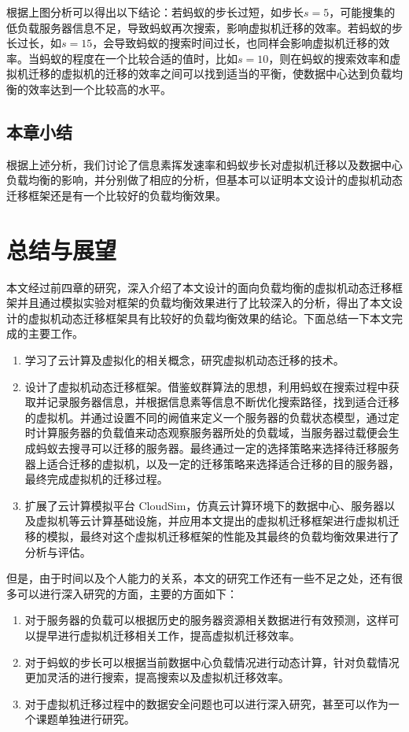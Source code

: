 根据上图分析可以得出以下结论：若蚂蚁的步长过短，如步长$ s = 5$，可能搜集的低负载服务器信息不足，导致蚂蚁再次搜索，影响虚拟机迁移的效率。若蚂蚁的步长过长，如$ s = 15 $，会导致蚂蚁的搜索时间过长，也同样会影响虚拟机迁移的效率。当蚂蚁的程度在一个比较合适的值时，比如$ s = 10 $，则在蚂蚁的搜索效率和虚拟机迁移的虚拟机的迁移的效率之间可以找到适当的平衡，使数据中心达到负载均衡的效率达到一个比较高的水平。

 \section{本章小结}
根据上述分析，我们讨论了信息素挥发速率和蚂蚁步长对虚拟机迁移以及数据中心负载均衡的影响，并分别做了相应的分析，但基本可以证明本文设计的虚拟机动态迁移框架还是有一个比较好的负载均衡效果。

\chapter{总结与展望}
本文经过前四章的研究，深入介绍了本文设计的面向负载均衡的虚拟机动态迁移框架并且通过模拟实验对框架的负载均衡效果进行了比较深入的分析，得出了本文设计的虚拟机动态迁移框架具有比较好的负载均衡效果的结论。下面总结一下本文完成的主要工作。

\begin{enumerate}[(1)]
    \item 学习了云计算及虚拟化的相关概念，研究虚拟机动态迁移的技术。
    \item 设计了虚拟机动态迁移框架。借鉴蚁群算法的思想，利用蚂蚁在搜索过程中获取并记录服务器信息，并根据信息素等信息不断优化搜索路径，找到适合迁移的虚拟机。并通过设置不同的阙值来定义一个服务器的负载状态模型，通过定时计算服务器的负载值来动态观察服务器所处的负载域，当服务器过载便会生成蚂蚁去搜寻可以迁移的服务器。最终通过一定的选择策略来选择待迁移服务器上适合迁移的虚拟机，以及一定的迁移策略来选择适合迁移的目的服务器，最终完成虚拟机的迁移过程。
    \item 扩展了云计算模拟平台 CloudSim，仿真云计算环境下的数据中心、服务器以及虚拟机等云计算基础设施，并应用本文提出的虚拟机迁移框架进行虚拟机迁移的模拟，最终对这个虚拟机迁移框架的性能及其最终的负载均衡效果进行了分析与评估。
\end{enumerate}

但是，由于时间以及个人能力的关系，本文的研究工作还有一些不足之处，还有很多可以进行深入研究的方面，主要的方面如下：

\begin{enumerate}[(1)]
    \item 对于服务器的负载可以根据历史的服务器资源相关数据进行有效预测，这样可以提早进行虚拟机迁移相关工作，提高虚拟机迁移效率。
    \item 对于蚂蚁的步长可以根据当前数据中心负载情况进行动态计算，针对负载情况更加灵活的进行搜索，提高搜索以及虚拟机迁移效率。
    \item 对于虚拟机迁移过程中的数据安全问题也可以进行深入研究，甚至可以作为一个课题单独进行研究。
\end{enumerate}


























